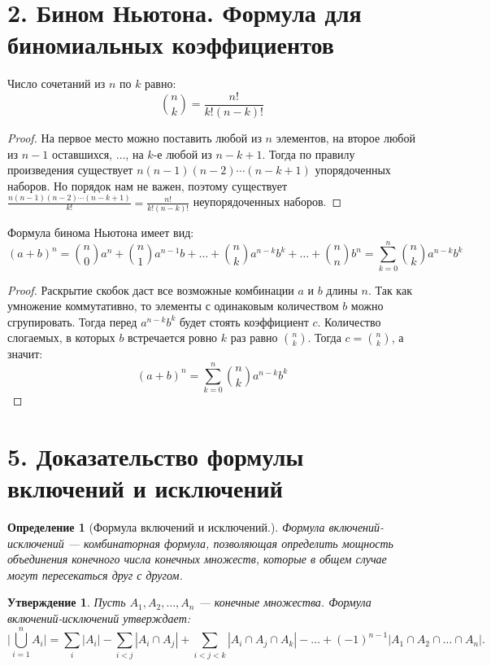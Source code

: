 \documentclass[a4paper,12pt]{article}
\newtheorem*{defin}{Определение}
\newtheorem*{state}{Утверждение}
\begin{document}
 	\section*{2. Бином Ньютона. Формула для биномиальных коэффициентов}
    Число сочетаний из $n$ по $k$ равно:
    \[
        \binom{n}{k} = \frac{n!}{k!(n - k)!}
    \]
    \begin{proof}
        На первое место можно поставить любой из $n$ элементов, на второе любой из $n - 1$ оставшихся, $\ldots$, на $k$-е любой из $n - k + 1$. Тогда по правилу произведения существует $n(n - 1)(n - 2)\cdots(n - k + 1)$ упорядоченных наборов. Но порядок нам не важен, поэтому существует $\displaystyle\frac{n(n - 1)(n - 2)\cdots(n - k + 1)}{k!} = \frac{n!}{k!(n - k)!}$ неупорядоченных наборов.
    \end{proof}
    Формула бинома Ньютона имеет вид:
    \[
        (a + b)^{n} = \binom{n}{0}a^{n} + \binom{n}{1}a^{n - 1}b + \ldots + \binom{n}{k}a^{n - k}b^{k} + \ldots + \binom{n}{n}b^{n} = \sum_{k = 0}^{n}\binom{n}{k}a^{n - k}b^{k}
    \]
    \begin{proof}
        Раскрытие скобок даст все возможные комбинации $a$ и $b$ длины $n$. Так как умножение коммутативно, то элементы с одинаковым количеством $b$ можно сгрупировать. Тогда перед $a^{n - k}b^{k}$ будет стоять коэффициент $c$. Количество слогаемых, в которых $b$ встречается ровно $k$ раз равно $\displaystyle\binom{n}{k}$. Тогда $c = \displaystyle\binom{n}{k}$, а значит:
        \[
            (a + b)^{n} = \sum_{k = 0}^{n}\binom{n}{k}a^{n - k}b^{k}
        \]
    \end{proof}

 	\section*{5. Доказательство формулы включений и исключений}
 	\begin{defin} [Формула включений и исключений.] Формула включений-исключений — комбинаторная формула, позволяющая определить мощность объединения конечного числа конечных множеств, которые в общем случае могут пересекаться друг с другом.
 	\end{defin}
 	\begin{state}
		Пусть $ A_{1}, A_{2},\ldots , A_{n} $ — конечные множества. Формула включений-исключений утверждает:
		$$\biggl | \bigcup_{i=1}^{n}A_i \biggl | =
		 \sum_{i} | A_i | - \sum_{i<j} | A_i \cap A_j | + \sum_{i<j<k} | A_i \cap A_j \cap A_k | - \ldots + (-1)^{n-1} | A_1 \cap A_2 \cap \ldots \cap A_n |.$$
 	\end{state}
\end{document}
